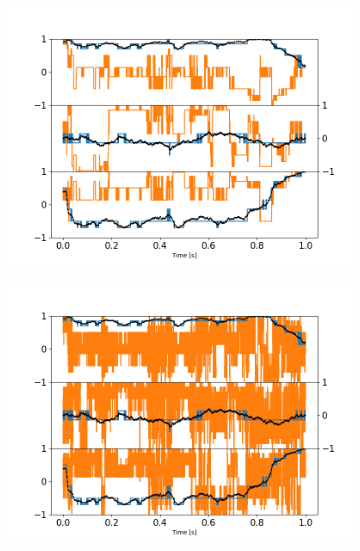 \documentclass[preprint,  3p]{elsarticle}
\begin{document}
\begin{figure}[h]
	\centering
	\begin{subfigure}{0.32\textwidth}
		\subcaption{}
		\includegraphics[width=\textwidth]{./Images/fig10a.png}
	\end{subfigure}
	\begin{subfigure}{0.32\textwidth}
		\subcaption{}
		\includegraphics[width=\textwidth]{./Images/fig10b.png}
	\end{subfigure}
	\begin{subfigure}{0.32\textwidth}
		\subcaption{}

\end{subfigure}
\end{figure}
\end{document}
